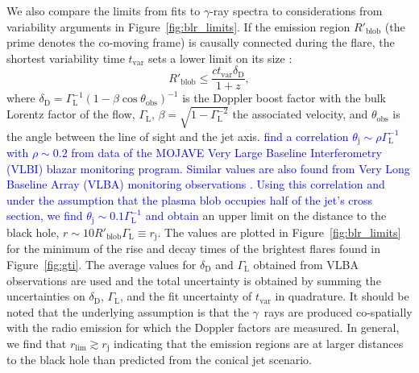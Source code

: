\documentclass[twocolumn,linenumbers]{aastex62}
\newcommand{\Grays}{$\gamma$~rays\xspace}
\newcommand{\gray}{$\gamma$-ray\xspace}
\newcommand{\response}[1]{\textcolor{blue}{#1}}
\begin{document}
We also compare the limits from fits to \gray spectra to considerations from variability arguments in Figure~\ref{fig:blr_limits}.
If the emission region $R'_\mathrm{blob}$ (the prime denotes the co-moving frame) is causally connected during the flare, the shortest variability time $t_\mathrm{var}$ sets a lower limit on its size \citep[e.g.,][]{2008MNRAS.384L..19B}:
\begin{equation}
    R'_\mathrm{blob} \leqslant \frac{ct_\mathrm{var}\delta_\mathrm{D}}{1+z},
    \label{eq:rblob}
\end{equation}
where $\delta_\mathrm{D} = \Gamma^{-1}_\mathrm{L}(1 - \beta\cos\theta_\mathrm{obs})^{-1}$ is the Doppler boost factor with the bulk Lorentz factor of the flow, $\Gamma_\mathrm{L}$, $\beta = \sqrt{1 - \Gamma_\mathrm{L}^{-2}}$ the associated velocity, and $\theta_\mathrm{obs} $ is the angle between the line of sight and the jet axis.
\response{
\citet{2013A&A...558A.144C} find a correlation 
$\theta_\mathrm{j} \sim \rho\Gamma^{-1}_\mathrm{L}$ with $\rho \sim 0.2$ from data of the MOJAVE Very Large Baseline Interferometry (VLBI) blazar monitoring program.
Similar values are also found from Very Long Baseline Array (VLBA) monitoring observations \citep{2017ApJ...846...98J}.
Using this correlation and under the assumption that the plasma blob occupies half of the jet's cross section, we find 
$\theta_\mathrm{j} \sim 0.1\Gamma^{-1}_\mathrm{L}$ and obtain
}
an upper limit on the distance to the black hole, $r \sim 10R'_\mathrm{blob}\Gamma_\mathrm{L} \equiv r_\mathrm{j}$.
The values are plotted in Figure~\ref{fig:blr_limits} for the minimum of the rise and decay times of the brightest flares found in Figure~\ref{fig:gti}.
The average values for $\delta_\mathrm{D}$ and $\Gamma_\mathrm{L}$ obtained from VLBA  observations are used \citep[see also Table~\ref{tab:src-select}]{2017ApJ...846...98J}  and the total  uncertainty is obtained by summing the uncertainties on $\delta_\mathrm{D}$, $\Gamma_\mathrm{L}$, and the fit uncertainty of $t_\mathrm{var}$ in quadrature.
It should be noted that the underlying assumption is that the \Grays are produced co-spatially with the radio emission for which the Doppler factors are measured.  
In general, we find that $r_\mathrm{lim} \gtrsim r_\mathrm{j}$ indicating that the emission regions are at larger distances to the black hole than predicted from the conical jet scenario.  
\end{document}
